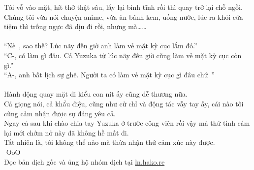 \documentclass[12pt,a4paper, twosides]{book}
\begin{document}
$$Tôi vỗ vào mặt, hít thở thật sâu, lấy lại bình tĩnh rồi thì quay trở lại chỗ ngồi.\\
Chúng tôi vừa nói chuyện anime, vừa ăn bánh kem, uống nước, lúc ra khỏi cửa tiệm thì trống ngực đã dịu đi rồi, nhưng mà……\\
\\
“Nè~, sao thế? Lúc nãy đến giờ anh làm vẻ mặt kỳ cục lắm đó.”\\
“C-, có làm gì đâu. Cả Yuzuka từ lúc nãy đến giờ cũng làm vẻ mặt kỳ cục còn gì.”\\
“A-, anh bất lịch sự ghê. Người ta có làm vẻ mặt kỳ cục gì đâu chứ~”\\
\\
Hành động quay mặt đi kiểu con nít ấy cũng dễ thương nữa.\\
Cả giọng nói, cả khẩu điệu, cũng như cử chỉ và động tác vẫy tay ấy, cái nào tôi cũng cảm nhận được sự đáng yêu cả.\\
Ngay cả sau khi chào chia tay Yuzuka ở trước công viên rồi vậy mà thứ tình cảm lại mới chớm nở này đã không hề mất đi.\\
Tất nhiên là, tôi không thể nào mà thừa nhận thứ cảm xúc này được.\\
-OoO-\\
Đọc bản dịch gốc và ủng hộ nhóm dịch tại \href{https://ln.hako.re/}{ln.hako.re}\\
\newpage
\end{document}
